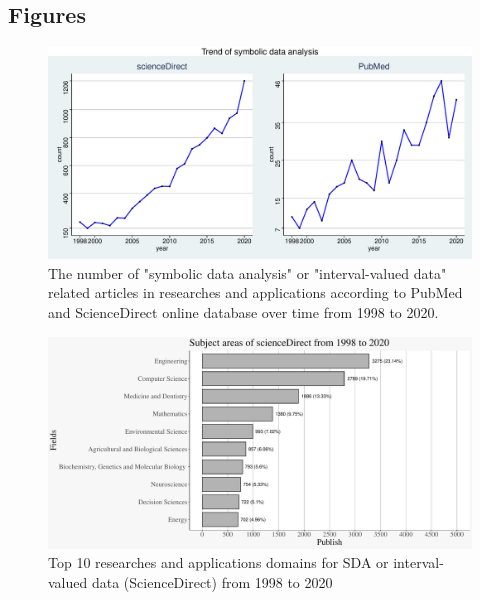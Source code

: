 \documentclass[article]{jss}
\begin{document}
\begin{appendix}


\section{Figures} \label{app:figures}
\begin{figure}[t!]
\centering 
\includegraphics[width=1\textwidth]{pic/TrendFig}
\caption{\label{fig:trend}The number of "symbolic data analysis" or "interval-valued data" related articles in researches and applications according to PubMed and ScienceDirect online database over time from 1998 to 2020.}
\end{figure}



\begin{figure}[t!]
\centering	 		
\includegraphics[width=1\textwidth]{pic/subjectFig} 
\caption{\label{fig:subjectAreas} Top 10 researches and applications domains for SDA or interval-valued data (ScienceDirect) from 1998 to 2020}  		   			 		 
\end{figure}




\end{appendix}
\end{document}
